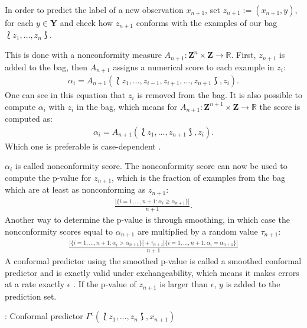 \documentclass[twoside,11pt]{article}
\begin{document}
In order to predict the label of a new observation
$x_{n+1}$, set $z_{n+1}:=(x_{n+1}, y)$, for each
$y \in \textbf{Y}$ and check how $z_{n+1}$ conforms with
the examples of our bag $\Lbag z_1,\dots,z_n \Rbag$.

This is done with a nonconformity measure
$A_{n+1}:\textbf{Z}^n \times \textbf{Z} \rightarrow
\mathbb{R}$. First, $z_{n+1}$ is added to the bag, then
$A_{n+1}$ assigns a numerical score to each example in
$z_i$:
\begin{align}
  \alpha_i = A_{n+1}(\Lbag z_1,\dots,z_{i-1},z_{i+1},
             \dots,z_{n+1} \Rbag, z_i).
\label{eq:a0}
\end{align}
One can see in this equation that $z_i$ is removed from the
bag. It is also possible to compute $\alpha_i$ with $z_i$
in the bag, which means for
$A_{n+1}:\textbf{Z}^{n+1} \times \textbf{Z} \rightarrow
\mathbb{R}$ the score is computed as:
\begin{align}
  \alpha_i = A_{n+1}(\Lbag z_1,\dots,z_{n+1} \Rbag, z_i).
\label{eq:a1}
\end{align}
Which one is preferable is case-dependent
\citep[see][chapter 4.2.2]{shafer_et_al_2008}.

$\alpha_i$ is called nonconformity score.
The nonconformity score can now be used to compute the
p-value for $z_{n+1}$, which is the fraction of examples
from the bag which are at least as nonconforming as
$z_{n+1}$:
\begin{align}
  \frac{|\{i=1,\dots,n+1: \alpha_i \geq \alpha_{n+1}\}|}
       {n + 1}.
\label{eq:p0}
\end{align}
Another way to determine the p-value is through smoothing,
in which case the nonconformity scores equal to
$\alpha_{n+1}$ are multiplied by a random value
$\tau_{n+1}$:
\begin{align}
  \frac{|\{i=1,\dots,n+1: \alpha_i > \alpha_{n+1}\}|
    + \tau_{n+1} |\{i=1,\dots,n+1:\alpha_i=\alpha_{n+1}\}|}
       {n + 1}
\label{eq:p1}
\end{align}
A conformal predictor using the smoothed p-value is called
a smoothed conformal predictor and is exactly valid under
exchangeability, which means it makes errors at a rate
exactly $\epsilon$ \citep[see][chapter 2]{alrw}.
If the p-value of $z_{n+1}$ is larger than $\epsilon$, $y$
is added to the prediction set.

\begin{algorithm}
  \caption{: Conformal predictor $\Gamma^\epsilon
    (\Lbag z_1,\dots,z_n \Rbag, x_{n+1})$}

  \begin{algorithmic}[1]
      \ENDFOR
      \ENDIF
    \ENDFOR
  \end{algorithmic}
\end{algorithm}
\end{document}
